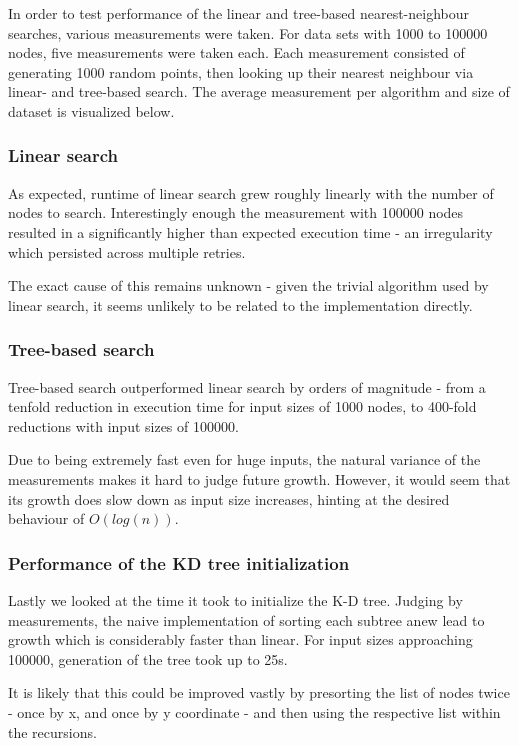 \documentclass[a4paper]{scrartcl}
\begin{document}
In order to test performance of the linear and tree-based nearest-neighbour
searches, various measurements were taken. For data sets with 1000 to 100000
nodes, five measurements were taken each. Each measurement consisted of
generating 1000 random points, then looking up their nearest neighbour via
linear- and tree-based search. The average measurement per algorithm and size
of dataset is visualized below.

\subsubsection{Linear search}

As expected, runtime of linear search grew roughly linearly with the number of
nodes to search. Interestingly enough the measurement with 100000 nodes
resulted in a significantly higher than expected execution time - an
irregularity which persisted across multiple retries.

The exact cause of this remains unknown - given the trivial algorithm used by
linear search, it seems unlikely to be related to the implementation directly.

\subsubsection{Tree-based search}

Tree-based search outperformed linear search by orders of magnitude - from a
tenfold reduction in execution time for input sizes of 1000 nodes, to 400-fold
reductions with input sizes of 100000.

Due to being extremely fast even for huge inputs, the natural variance of the
measurements makes it hard to judge future growth. However, it would seem that
its growth does slow down as input size increases, hinting at the desired
behaviour of $O(log(n))$.

\subsubsection{Performance of the KD tree initialization}

Lastly we looked at the time it took to initialize the K-D tree. Judging by
measurements, the naive implementation of sorting each subtree anew lead to
growth which is considerably faster than linear. For input sizes approaching
100000, generation of the tree took up to 25s.

It is likely that this could be improved vastly by presorting the list of nodes
twice - once by x, and once by y coordinate - and then using the respective list
within the recursions. 
\end{document}
